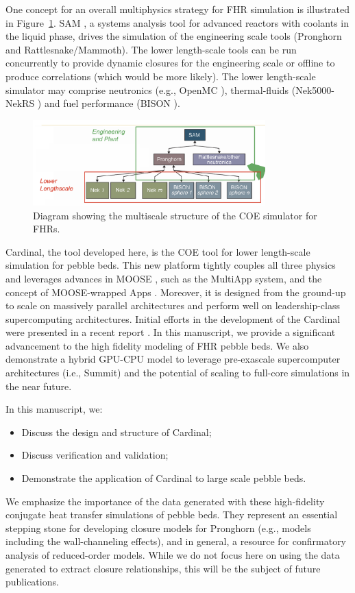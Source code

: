 One concept for an overall multiphysics strategy for FHR simulation is illustrated in Figure~\ref{f:fhr1}. SAM \cite{hu2017sam}, a systems analysis tool for advanced reactors with coolants in the liquid phase, drives the simulation of the engineering scale tools (Pronghorn and Rattlesnake/Mammoth). The lower length-scale tools can be run concurrently to provide dynamic closures for the engineering scale or offline to produce correlations (which would be more likely). The lower length-scale simulator may comprise neutronics (e.g., OpenMC \cite{romano2013openmc}), thermal-fluids (Nek5000-NekRS \cite{fischer2008}) and fuel performance (BISON \cite{hales2013triso}).

\begin{figure}[!h]
\centering
\includegraphics[clip=true,width=0.8\textwidth]{Figures/fhr_graph}
\caption{Diagram showing the multiscale structure of the COE simulator for FHRs.}
\label{f:fhr1}
\end{figure}

Cardinal, the tool developed here, is the COE tool for lower length-scale simulation for pebble beds. This new platform tightly couples all three physics and leverages advances in MOOSE \cite{gaston2009moose, permann2020moose}, such as the MultiApp system, and the concept of MOOSE-wrapped Apps \cite{gaston2015physics}. Moreover, it is designed from the ground-up to scale on massively parallel architectures and perform well on leadership-class supercomputing architectures. Initial efforts in the development of the Cardinal were presented in a recent report \cite{cardinal}. In this manuscript, we provide a significant advancement to the high fidelity modeling of FHR pebble beds. We also demonstrate a hybrid GPU-CPU model to leverage pre-exascale supercomputer architectures (i.e., Summit) and the potential of scaling to full-core simulations in the near future.

In this manuscript, we:
\begin{itemize}
\item Discuss the design and structure of Cardinal;
\item Discuss verification and validation;
\item Demonstrate the application of Cardinal to large scale pebble beds.
\end{itemize}

We emphasize the importance of the data generated with these high-fidelity conjugate heat transfer simulations of pebble beds. They represent an essential stepping stone for developing closure models for Pronghorn (e.g., models including the wall-channeling effects), and in general, a resource for confirmatory analysis of reduced-order models. While we do not focus here on using the data generated to extract closure relationships, this will be the subject of future publications.
